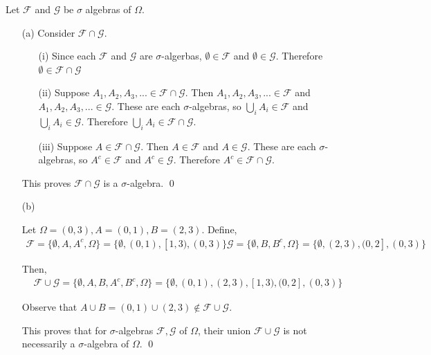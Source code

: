 \documentclass[10pt]{article}
\begin{document}
\begin{solution}[Solution]
Let \( \mathcal{F} \) and \( \mathcal{G} \) be \( \sigma \) algebras of \( \Omega \).
\begin{enumerate}
	\item[(a)] Consider \( \mathcal{F}\cap\mathcal{G} \).
        \begin{enumerate}
            \item[(i)] Since each \( \mathcal{F} \) and \( \mathcal{G} \) are \( \sigma \)-algerbas, \( \emptyset\in\mathcal{F} \) and \( \emptyset\in\mathcal{G} \). Therefore \( \emptyset\in\mathcal{F}\cap\mathcal{G} \)
            \item[(ii)]  Suppose \( A_1, A_2, A_3, ...\in\mathcal{F}\cap\mathcal{G} \). Then \( A_1, A_2, A_3, ...\in\mathcal{F} \) and \( A_1, A_2, A_3,...\in\mathcal{G} \). These are each \( \sigma \)-algebras, so \( \bigcup_iA_i\in\mathcal{F} \) and \( \bigcup_iA_i\in\mathcal{G} \). Therefore \( \bigcup_iA_i\in\mathcal{F}\cap\mathcal{G} \).

            \item[(iii)] Suppose \( A\in\mathcal{F}\cap\mathcal{G} \). Then \( A\in\mathcal{F} \) and \( A\in\mathcal{G} \). These are each \( \sigma \)-algebras, so \( A^c\in\mathcal{F} \) and \( A^c\in\mathcal{G} \). Therefore \( A^c\in\mathcal{F}\cap\mathcal{G} \).
        \end{enumerate}
        This proves \( \mathcal{F}\cap\mathcal{G} \) is a \( \sigma \)-algebra. \qed
    \item[(b)] 
        
         Let \( \Omega = (0,3),  A=(0,1), B=(2,3) \). Define,
        \begin{align*}  
            \mathcal{F}=\{\emptyset, A,A^c, \Omega\} = \{\emptyset,(0,1),[1,3),(0,3)\} 
            \mathcal{G}=\{\emptyset, B,B^c, \Omega\} = \{\emptyset,(2,3),(0,2],(0,3)\} 
        \end{align*}

        Then,
        \begin{align*}
            \mathcal{F}\cup\mathcal{G} = \{\emptyset,A,B,A^c,B^c,\Omega\} = \{ \emptyset, (0,1),(2,3),[1,3),(0,2],(0,3) \}
        \end{align*}

        Observe that \( A\cup B = (0,1)\cup(2,3)\notin \mathcal{F}\cup\mathcal{G} \).

        This proves that for \( \sigma \)-algebras \( \mathcal{F}, \mathcal{G} \) of \( \Omega \), their union \( \mathcal{F}\cup\mathcal{G} \) is not necessarily a \( \sigma \)-algebra of \( \Omega \). \qed


\end{enumerate}
\end{solution}
\end{document}

